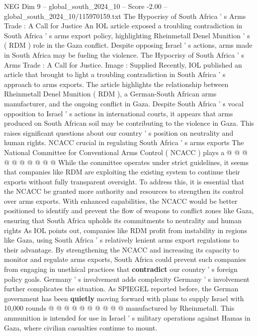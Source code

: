 \begin{textsample}{NEG Dim 9 – global\_south\_2024\_10 – Score -2.00 – global\_south\_2024\_10/115970159.txt}  \label{ex:f9_neg_371}
The Hypocrisy of South Africa ' s Arms Trade : A Call for Justice An IOL article exposed a troubling contradiction in South Africa ' s arms export policy, highlighting Rheinmetall Denel Munition ' s ( RDM ) role in the Gaza conflict.
Despite opposing Israel ' s actions, arms made in South Africa may be fueling the violence.
The Hypocrisy of South Africa ' s Arms Trade : A Call for Justice.
Image : Supplied Recently, IOL published an article that brought to light a troubling contradiction in South Africa ' s approach to arms exports.
The article highlights the relationship between Rheinmetall Denel Munition ( RDM ), a German-South African arms manufacturer, and the ongoing conflict in Gaza.
Despite South Africa ' s vocal opposition to Israel ' s actions in international courts, it appears that arms produced on South African soil may be contributing to the violence in Gaza.
This raises significant questions about our country ' s position on neutrality and human rights.
NCACC crucial in regulating South Africa ' s arms exports The National Committee for Conventional Arms Control ( NCACC ) plays a @ @ @ @ @ @ @ @ @ @ While the committee operates under strict guidelines, it seems that companies like RDM are exploiting the existing system to continue their exports without fully transparent oversight.
To address this, it is essential that the NCACC be granted more authority and resources to strengthen its control over arms exports.
With enhanced capabilities, the NCACC would be better positioned to identify and prevent the flow of weapons to conflict zones like Gaza, ensuring that South Africa upholds its commitments to neutrality and human rights As IOL points out, companies like RDM profit from instability in regions like Gaza, using South Africa ' s relatively lenient arms export regulations to their advantage.
By strengthening the NCACC and increasing its capacity to monitor and regulate arms exports, South Africa could prevent such companies from engaging in unethical practices that \textbf{contradict} our country ' s foreign policy goals.
Germany ' s involvement adds complexity Germany ' s involvement further complicates the situation.
As SPIEGEL reported before, the German government has been \textbf{quietly} moving forward with plans to supply Israel with 10,000 rounds @ @ @ @ @ @ @ @ @ @ manufactured by Rheinmetall.
This ammunition is intended for use in Israel ' s military operations against Hamas in Gaza, where civilian casualties continue to mount.

\end{textsample}
